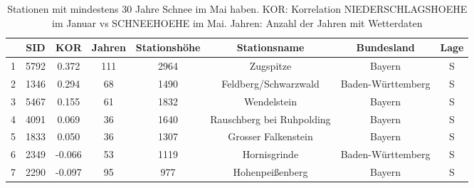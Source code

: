 \documentclass[11pt]{article}
\begin{document}
\begin{landscape}
\begin{table*}
\centering   
\caption{Stationen mit mindestens 30 Jahre Schnee im Mai haben. KOR: Korrelation NIEDERSCHLAGSHOEHE im Januar vs SCHNEEHOEHE im Mai. Jahren: Anzahl der Jahren mit Wetterdaten \\} 
\label{tab:}  
\renewcommand{\arraystretch}{1.3}
 \begin{small}
\begin{tabular}{cccccccc}
  \toprule
 & \textbf{SID} & \textbf{KOR} & \textbf{Jahren} & \textbf{Stationsh\"ohe} & \textbf{Stationsname} & \textbf{Bundesland} & \textbf{Lage} \\ 
  \midrule
1 & 5792 & 0.372 & 111 & 2964 & Zugspitze & Bayern & S \\ 
  2 & 1346 & 0.294 & 68 & 1490 & Feldberg/Schwarzwald & Baden-Württemberg & S \\ 
  3 & 5467 & 0.155 & 61 & 1832 & Wendelstein & Bayern & S \\ 
  4 & 4091 & 0.069 & 36 & 1640 & Rauschberg bei Ruhpolding & Bayern & S \\ 
  5 & 1833 & 0.050 & 36 & 1307 & Grosser Falkenstein & Bayern & S \\ 
  6 & 2349 & -0.066 & 53 & 1119 & Hornisgrinde & Baden-Württemberg & S \\ 
  7 & 2290 & -0.097 & 95 & 977 & Hohenpeißenberg & Bayern & S \\ 
   \bottomrule
\end{tabular}
\end{small}
\end{table*}

\end{landscape}
\end{document}
